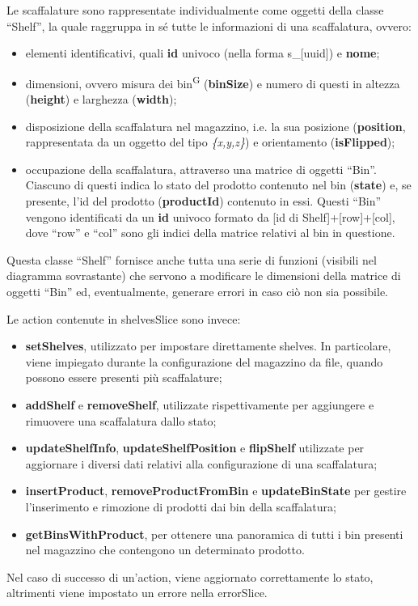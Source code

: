 Le scaffalature sono rappresentate individualmente come oggetti della classe ``Shelf'', la quale raggruppa in sé tutte le informazioni di una scaffalatura, ovvero:
\begin{itemize}
    \item elementi identificativi, quali \textbf{id} univoco (nella forma s\_[uuid]) e \textbf{nome};
    \item dimensioni, ovvero misura dei bin\textsuperscript{G} (\textbf{binSize}) e numero di questi in altezza (\textbf{height}) e larghezza (\textbf{width});
    \item disposizione della scaffalatura nel magazzino, i.e. la sua posizione (\textbf{position}, rappresentata da un oggetto del tipo \textit{\{x,y,z\}}) e orientamento (\textbf{isFlipped});
    \item occupazione della scaffalatura, attraverso una matrice di oggetti ``Bin''. Ciascuno di questi indica lo stato del prodotto contenuto nel bin (\textbf{state}) e, se presente, l'id del prodotto (\textbf{productId}) contenuto in essi. Questi ``Bin'' vengono identificati da un \textbf{id} univoco formato da [id di Shelf]+[row]+[col], dove ``row'' e ``col'' sono gli indici della matrice relativi al bin in questione.
\end{itemize}
Questa classe ``Shelf'' fornisce anche tutta una serie di funzioni (visibili nel diagramma sovrastante) che servono a modificare le dimensioni della matrice di oggetti ``Bin'' ed, eventualmente, generare errori in caso ciò non sia possibile.

\bigskip
\noindent Le action contenute in shelvesSlice sono invece:
\begin{itemize}
    \item \textbf{setShelves}, utilizzato per impostare direttamente shelves. In particolare, viene impiegato durante la configurazione del magazzino da file, quando possono essere presenti più scaffalature;
    \item \textbf{addShelf} e \textbf{removeShelf}, utilizzate rispettivamente per aggiungere e rimuovere una scaffalatura dallo stato;
    \item \textbf{updateShelfInfo}, \textbf{updateShelfPosition} e \textbf{flipShelf} utilizzate per aggiornare i diversi dati relativi alla configurazione di una scaffalatura;
    \item \textbf{insertProduct}, \textbf{removeProductFromBin} e \textbf{updateBinState} per gestire l'inserimento e rimozione di prodotti dai bin della scaffalatura;
    \item \textbf{getBinsWithProduct}, per ottenere una panoramica di tutti i bin presenti nel magazzino che contengono un determinato prodotto.
\end{itemize}
Nel caso di successo di un'action, viene aggiornato correttamente lo stato, altrimenti viene impostato un errore nella errorSlice.

